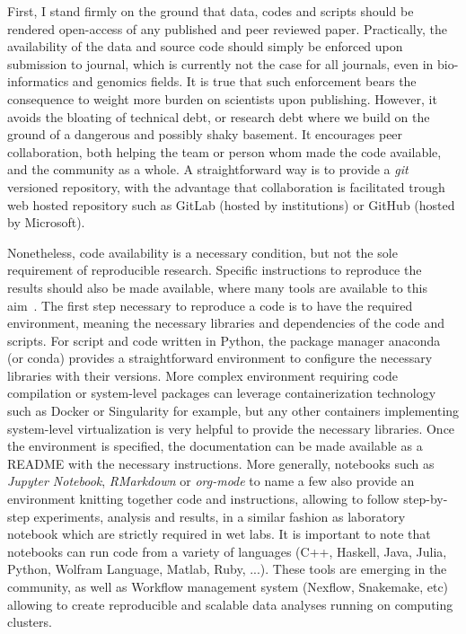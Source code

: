 First, I stand firmly on the ground that data, codes and scripts should be rendered open-access of any published and peer reviewed paper.
Practically, the availability of the data and source code should simply be enforced upon submission to journal, which is currently not the case for all journals, even in bio-informatics and genomics fields.
It is true that such enforcement bears the consequence to weight more burden on scientists upon publishing.
However, it avoids the bloating of technical debt, or research debt where we build on the ground of a dangerous and possibly shaky basement.
It encourages peer collaboration, both helping the team or person whom made the code available, and the community as a whole.
A straightforward way is to provide a \textit{git} versioned repository, with the advantage that collaboration is facilitated trough web hosted repository such as GitLab (hosted by institutions) or GitHub (hosted by Microsoft).

Nonetheless, code availability is a necessary condition, but not the sole requirement of reproducible research.
Specific instructions to reproduce the results should also be made available, where many tools are available to this aim~\citep{Wilson2014,Darriba2018}.
The first step necessary to reproduce a code is to have the required environment, meaning the necessary libraries and dependencies of the code and scripts.
For script and code written in Python, the package manager anaconda (or conda) provides a straightforward environment to configure the necessary libraries with their versions.
More complex environment requiring code compilation or system-level packages can leverage containerization technology such as Docker or Singularity for example, but any other containers implementing system-level virtualization is very helpful to provide the necessary libraries.
Once the environment is specified, the documentation can be made available as a README with the necessary instructions.
More generally, notebooks such as \textit{Jupyter Notebook}, \textit{RMarkdown} or \textit{org-mode} to name a few also provide an environment knitting together code and instructions, allowing to follow step-by-step experiments, analysis and results, in a similar fashion as laboratory notebook which are strictly required in wet labs.
It is important to note that notebooks can run code from a variety of languages (C++, Haskell, Java, Julia, Python, Wolfram Language, Matlab, Ruby, ...).
These tools are emerging in the community, as well as Workflow management system (Nexflow, Snakemake, etc) allowing to create reproducible and scalable data analyses running on computing clusters.

